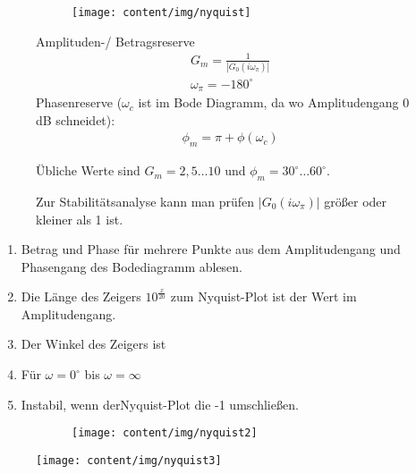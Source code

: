 \begin{tcolorbox}[colback=white!10!white,colframe=green!30!black,title=Nyquist] 
\begin{figure}[H]
    \begin{subfigure}{0.5\linewidth}
        \texttt{[image: content/img/nyquist]}
        \label{fig:nyquist}
    \end{subfigure}
    \begin{minipage}{0.45\linewidth}
        Amplituden-/ Betragsreserve 
        \begin{align*}
            &G_m = \frac{1}{|G_0(i\omega_\pi)|}\\
            & \omega_\pi = -180^{\circ}
        \end{align*}
        Phasenreserve ($\omega_c$ ist im Bode Diagramm, da wo Amplitudengang $0$dB schneidet):
        \begin{align*}
            &\phi_m = \pi + \phi(\omega_c)
        \end{align*}
        
    \end{minipage}
    Übliche Werte sind $G_m = 2,5 \ldots  10$ und $\phi_m = 30^{\circ} \dots 60^{\circ}  $. 
    
    Zur Stabilitätsanalyse kann man prüfen $|G_0(i\omega_\pi)| $ größer oder kleiner als 1 ist. 
\end{figure}
     \tcblower
     \begin{enumerate}
        \item Betrag und Phase für mehrere Punkte aus dem Amplitudengang und Phasengang des Bodediagramm ablesen. 
        \item Die Länge des Zeigers $10^{\frac{x}{20}}$ zum Nyquist-Plot ist der Wert im Amplitudengang.
        \item Der Winkel des Zeigers ist 
        \item Für $\omega = 0^{\circ}$ bis $\omega = \infty$
        \item Instabil, wenn derNyquist-Plot  die -1  umschließen.
     \end{enumerate}
     
 \begin{figure}[H]
     \begin{subfigure}{0.5\linewidth}
         \texttt{[image: content/img/nyquist2]}
     \end{subfigure}
     \begin{minipage}{0.45\linewidth}
         \texttt{[image: content/img/nyquist3]}     
     \end{minipage}
 
 \end{figure}
\end{tcolorbox}

